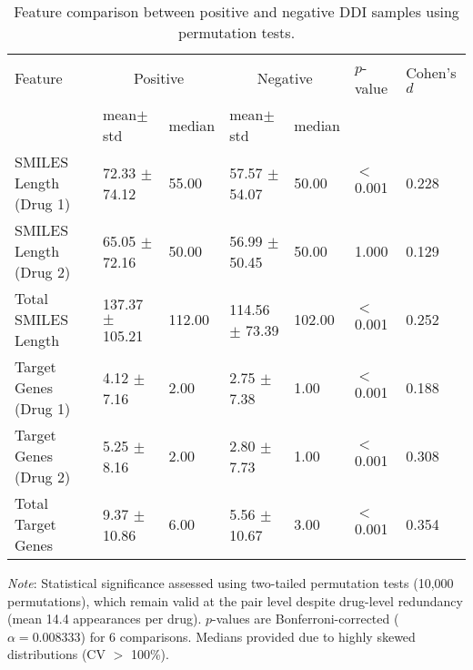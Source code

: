 \begin{table}[htbp]
\centering
\tiny
\caption{Feature comparison between positive and negative DDI samples using permutation tests.}
\label{tab:ddi_feature_comparison}
\begin{tabular}{lllllll}
\toprule
Feature & \multicolumn{2}{c}{Positive} & \multicolumn{2}{c}{Negative} & $p$-value & Cohen's $d$ \\
\cmidrule(lr){2-3} \cmidrule(lr){4-5}
 & mean$\pm$std & median & mean$\pm$std & median & & \\
\midrule
SMILES Length (Drug 1) & 72.33 $\pm$ 74.12 & 55.00 & 57.57 $\pm$ 54.07 & 50.00 & $<$0.001 & 0.228 \\
SMILES Length (Drug 2) & 65.05 $\pm$ 72.16 & 50.00 & 56.99 $\pm$ 50.45 & 50.00 & 1.000 & 0.129 \\
Total SMILES Length & 137.37 $\pm$ 105.21 & 112.00 & 114.56 $\pm$ 73.39 & 102.00 & $<$0.001 & 0.252 \\
Target Genes (Drug 1) & 4.12 $\pm$ 7.16 & 2.00 & 2.75 $\pm$ 7.38 & 1.00 & $<$0.001 & 0.188 \\
Target Genes (Drug 2) & 5.25 $\pm$ 8.16 & 2.00 & 2.80 $\pm$ 7.73 & 1.00 & $<$0.001 & 0.308 \\
Total Target Genes & 9.37 $\pm$ 10.86 & 6.00 & 5.56 $\pm$ 10.67 & 3.00 & $<$0.001 & 0.354 \\
\bottomrule
\end{tabular}
\vspace{2mm}

{\footnotesize
\textit{Note}: Statistical significance assessed using two-tailed permutation tests (10,000 permutations), which remain valid at the pair level despite drug-level redundancy (mean 14.4 appearances per drug). $p$-values are Bonferroni-corrected ($\alpha = 0.008333$) for 6 comparisons. Medians provided due to highly skewed distributions (CV $>$ 100\%).
}
\end{table}
